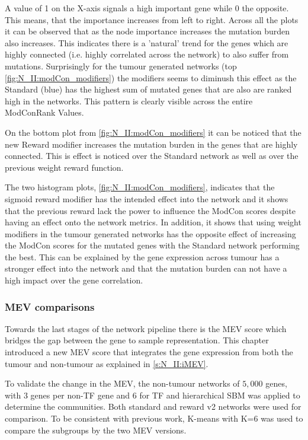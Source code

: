 A value of 1 on the X-axis signals a high important gene while 0 the opposite. This means, that the importance increases from left to right. Across all the plots it can be observed that as the node importance increases the mutation burden also increases. This indicates there is a 'natural' trend for the genes which are highly connected (i.e. highly correlated across the network) to also suffer from mutations. Surprisingly for the tumour generated networks (top \cref{fig:N_II:modCon_modifiers}) the modifiers seems to diminush this effect as the Standard (blue) has the highest sum of mutated genes that are also are ranked high in the networks. This pattern is clearly visible across the entire ModConRank Values.

On the bottom plot from \cref{fig:N_II:modCon_modifiers} it can be noticed that the new Reward modifier increases the mutation burden in the genes that are highly connected. This is effect is noticed over the Standard network as well as over the previous weight reward function. 

The two histogram plots, \cref{fig:N_II:modCon_modifiers}, indicates that the sigmoid reward modifier has the intended effect into the network and it shows that the previous reward lack the power to influence the ModCon scores despite having an effect onto the network metrics. In addition, it shows that using weight modifiers in the tumour generated networks has the opposite effect of increasing the ModCon scores for the mutated genes with the Standard network performing the best. This can be explained by the gene expression across tumour has a stronger effect into the network and that the mutation burden can not have a high impact over the gene correlation.


\subsubsection{MEV comparisons} \label{s:N_II:mev_comp}

Towards the last stages of the network pipeline there is the MEV score which bridges the gap between the gene to sample representation. This chapter introduced a new MEV score that integrates the gene expression from both the tumour and non-tumour as explained in \cref{s:N_II:iMEV}.

To validate the change in the MEV, the non-tumour networks of $5,000$ genes, with $3$ genes per non-TF gene and $6$ for TF and hierarchical SBM was applied to determine the communities. Both standard and reward v2 networks were used for comparison. To be consistent with previous work, K-means with K=6 was used to compare the subgroups by the two MEV versions.

